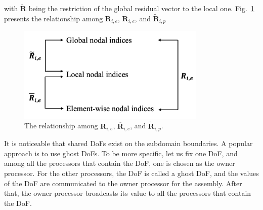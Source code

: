 \documentclass[preprint,12pt,sort&compress]{elsarticle}
\theoremstyle{definition}%
\begin{document}
with $\tilde{\bm{R}}$ being the restriction of the global residual vector to the local one.
Fig.~\ref{fig:restriction} presents the relationship among $\bm{R}_{i,e}$, $\overline{\bm{R}}_{i,e}$, and $\tilde{\bm{R}}_{i,p}$\\
\begin{figure}[!htbp]
  \centering
  \includegraphics[angle=0,width=0.8\textwidth]{fig/algebraic-restriction.png}
  \caption{The relationship among $\bm{R}_{i,e}$, $\overline{\bm{R}}_{i,e}$, and $\tilde{\bm{R}}_{i,p}$.}
  \label{fig:restriction}
\end{figure}
It is noticeable that shared DoFs exist on the subdomain boundaries. A popular approach 
is to use ghost DoFs. 
To be more specific, let us fix one DoF, and among all the processors that contain the DoF, one is chosen as the owner processor.
For the other processors, the DoF is called a ghost DoF, and the values of the DoF are communicated to the owner processor for the assembly.
After that, the owner processor broadcasts its value to all the processors that contain the DoF.
\end{document}
